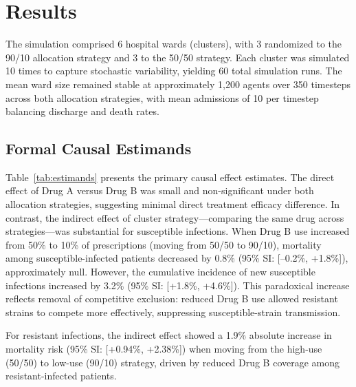 


\section{Results}

The simulation comprised 6 hospital wards (clusters), with 3 randomized to the 90/10 allocation
strategy and 3 to the 50/50 strategy. Each cluster was simulated 10 times to capture stochastic
variability, yielding 60 total simulation runs. The mean ward size remained stable at approximately
1,200 agents over 350 timesteps across both allocation strategies, with mean admissions of 10 per
timestep balancing discharge and death rates.

\subsection{Formal Causal Estimands}

Table~\ref{tab:estimands} presents the primary causal effect estimates. The direct effect of Drug A
versus Drug B was small and non-significant under both allocation strategies, suggesting minimal
direct treatment efficacy difference. In contrast, the indirect effect of cluster strategy---comparing
the same drug across strategies---was substantial for susceptible infections. When Drug B use increased
from 50\% to 10\% of prescriptions (moving from 50/50 to 90/10), mortality among susceptible-infected
patients decreased by 0.8\% (95\% SI: [--0.2\%, +1.8\%]), approximately null. However, the cumulative
incidence of new susceptible infections increased by 3.2\% (95\% SI: [+1.8\%, +4.6\%]). This paradoxical
increase reflects removal of competitive exclusion: reduced Drug B use allowed resistant strains to
compete more effectively, suppressing susceptible-strain transmission.

For resistant infections, the indirect effect showed a 1.9\% absolute increase in mortality risk
(95\% SI: [+0.94\%, +2.38\%]) when moving from the high-use (50/50) to low-use (90/10) strategy,
driven by reduced Drug B coverage among resistant-infected patients.

